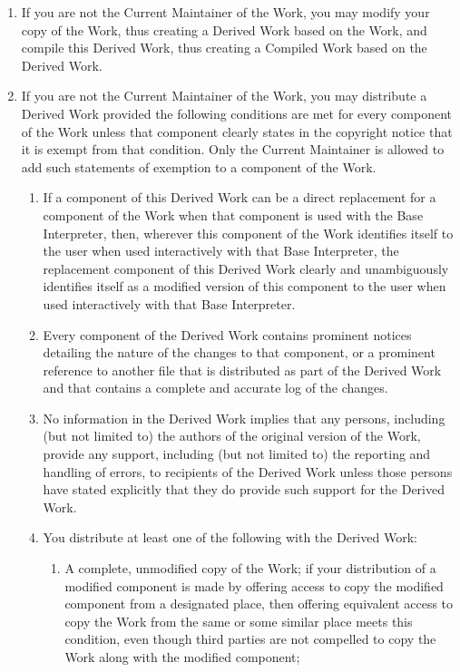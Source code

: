 \begin{LPPLicense}
\begin{enumerate}
  \item If you are not the Current Maintainer of the Work, you may
    modify your copy of the Work, thus creating a Derived Work based
    on the Work, and compile this Derived Work, thus creating a
    Compiled Work based on the Derived Work.

  \item\label{LPPL:item:conditions} If you are not the Current Maintainer of the
    Work, you may distribute a Derived Work provided the following
    conditions are met for every component of the Work unless that
    component clearly states in the copyright notice that it is exempt
    from that condition.  Only the Current Maintainer is allowed to
    add such statements of exemption to a component of the Work.
    \begin{enumerate}
    \item If a component of this Derived Work can be a direct
      replacement for a component of the Work when that component is
      used with the Base Interpreter, then, wherever this component of
      the Work identifies itself to the user when used interactively
      with that Base Interpreter, the replacement component of this
      Derived Work clearly and unambiguously identifies itself as a
      modified version of this component to the user when used
      interactively with that Base Interpreter.
     
    \item Every component of the Derived Work contains prominent
      notices detailing the nature of the changes to that component,
      or a prominent reference to another file that is distributed as
      part of the Derived Work and that contains a complete and
      accurate log of the changes.
  
    \item No information in the Derived Work implies that any persons,
      including (but not limited to) the authors of the original
      version of the Work, provide any support, including (but not
      limited to) the reporting and handling of errors, to recipients
      of the Derived Work unless those persons have stated explicitly
      that they do provide such support for the Derived Work.

    \item You distribute at least one of the following with the Derived Work:
      \begin{enumerate}
      \item A complete, unmodified copy of the Work; if your
        distribution of a modified component is made by offering
        access to copy the modified component from a designated place,
        then offering equivalent access to copy the Work from the same
        or some similar place meets this condition, even though third
        parties are not compelled to copy the Work along with the
        modified component;


\end{enumerate}
\end{enumerate}
\end{enumerate}
\end{LPPLicense}
